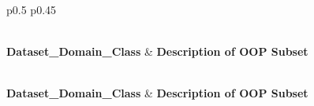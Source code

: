 \documentclass{article} %
\begin{document}
\clearpage
\begin{longtable}{p{} p{}}
\caption{VisDiff: Differences Identified for Image Sets. We use VisDiff~\citep{VisDiff}, an LLM-based system for describing differences between images sets, to identify differences in between IP and OOP images. We do so independently for each dataset, domain, and class grouping. Distractors unrelated to the class seem to be an issue. For more details see Section \ref{sec:app_visdiff}.} \label{tab:visdiff} \\
\toprule
\textbf{Dataset\_Domain\_Class} & \textbf{Description of OOP Subset} \\
\midrule
\endfirsthead

%
{{\tablename\ \thetable{}}} \\
\toprule
\textbf{Dataset\_Domain\_Class} & \textbf{Description of OOP Subset} \\
\midrule
\endhead

 \\
\bottomrule
\endfoot

\bottomrule
\endlastfoot


\end{longtable}
\end{document}
